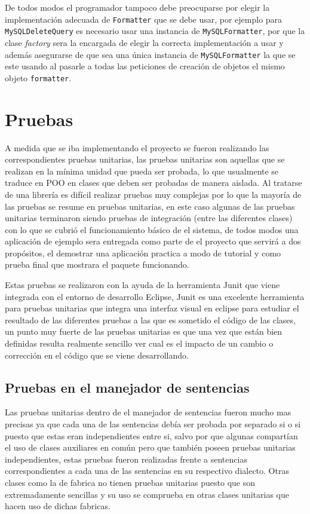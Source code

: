 De todos modos el programador tampoco debe preocuparse por elegir la implementación adecuada de \verb=Formatter= que se debe usar, por ejemplo para \verb=MySQLDeleteQuery= es necesario usar una instancia de \verb=MySQLFormatter=, por que la clase \textit{factory} sera la encargada de elegir la correcta implementación a usar y además asegurarse de que sea una única instancia de \verb=MySQLFormatter= la que se este usando al pasarle a todas las peticiones de creación de objetos el mismo objeto \verb=formatter=.
%
\section{Pruebas}
A medida que se iba implementando el proyecto se fueron realizando las correspondientes pruebas unitarias, las pruebas unitarias son aquellas que se realizan en la mínima unidad que pueda ser probada, lo que usualmente se traduce en POO en clases que deben ser probadas de manera aislada. Al tratarse de una librería es difícil realizar pruebas muy complejas por lo que la mayoría de las pruebas se resume en pruebas unitarias, en este caso algunas de las pruebas unitarias terminaron siendo pruebas de integración (entre las diferentes clases) con lo que se cubrió el funcionamiento básico de el sistema, de todos modos una aplicación de ejemplo sera entregada como parte de el proyecto que servirá a dos propósitos, el demostrar una aplicación practica a modo de tutorial y como prueba final que mostrara el paquete funcionando.

Estas pruebas se realizaron con la ayuda de la herramienta Junit que viene integrada con el entorno de desarrollo Eclipse, Junit es una excelente herramienta para pruebas unitarias que integra una interfaz visual en eclipse para estudiar el resultado de las diferentes pruebas a las que es sometido el código de las clases, un punto muy fuerte de las pruebas unitarias es que una vez que están bien definidas resulta realmente sencillo ver cual es el impacto de un cambio o corrección en el código que se viene desarrollando.
%
\subsection{Pruebas en el manejador de sentencias}
Las pruebas unitarias dentro de el manejador de sentencias fueron mucho mas precisas ya que cada una de las sentencias debía ser probada por separado si o si puesto que estas eran independientes entre si, salvo por que algunas compartían el uso de clases auxiliares en común pero que también poseen pruebas unitarias independientes, estas pruebas fueron realizadas frente a sentencias correspondientes a cada una de las sentencias en su respectivo dialecto. Otras clases como la de fabrica no tienen pruebas unitarias puesto que son extremadamente sencillas y su uso se comprueba en otras clases unitarias que hacen uso de dichas fabricas.

